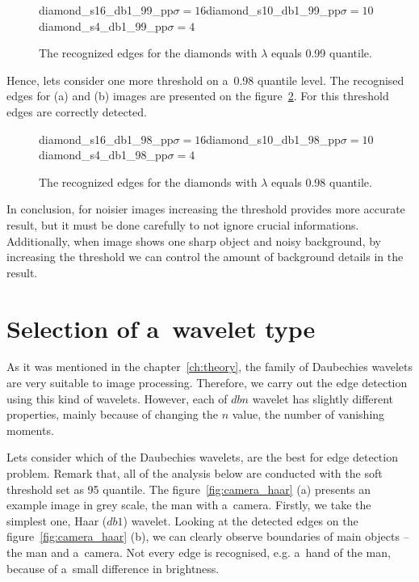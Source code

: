 \begin{figure}[h]
	\begin{subdiagrams3}{diamond_s16_db1_99_pp}{$\sigma=16$}{diamond_s10_db1_99_pp}{$\sigma=10$}{diamond_s4_db1_99_pp}{$\sigma=4$}
	\end{subdiagrams3}
	\centering
	\caption{The recognized edges for the diamonds with $\lambda$ equals 0.99 quantile.}
	\label{fig:diamonds_99}
\end{figure}

Hence, lets consider one more threshold on a~0.98 quantile level. The recognised edges for (a) and (b) images are presented on the figure~\ref{fig:diamonds_98}. For this threshold edges are correctly detected.

\begin{figure}[h]
	\begin{subdiagrams3}{diamond_s16_db1_98_pp}{$\sigma=16$}{diamond_s10_db1_98_pp}{$\sigma=10$}{diamond_s4_db1_98_pp}{$\sigma=4$}
	\end{subdiagrams3}
	\centering
	\caption{The recognized edges for the diamonds with $\lambda$ equals 0.98 quantile.}
	\label{fig:diamonds_98}
\end{figure}


In conclusion, for noisier images increasing the threshold provides more accurate result, but it must be done carefully to not ignore crucial informations. Additionally, when image shows one sharp object and noisy background, by increasing the threshold we can control the amount of background details in the result.

\section{Selection of a~wavelet type}
\label{sec:wavelet_type}

As it was mentioned in the chapter~\ref{ch:theory}, the family of Daubechies wavelets are very suitable to image processing. Therefore, we carry out the edge detection using this kind of wavelets. However, each of $dbn$ wavelet has slightly different properties, mainly because of changing the $n$ value, the number of vanishing moments.

Lets consider which of the Daubechies wavelets, are the best for edge detection problem. Remark that, all of the analysis below are conducted with the soft threshold set as 95 quantile. The figure~\ref{fig:camera_haar} (a) presents an example image in grey scale, the man with a~camera.
Firstly, we take the simplest one, Haar ($db1$) wavelet. Looking at the detected edges on the figure~\ref{fig:camera_haar} (b), we can clearly observe boundaries of main objects -- the man and a~camera. Not every edge is recognised, e.g. a~hand of the man, because of a~small difference in brightness.

